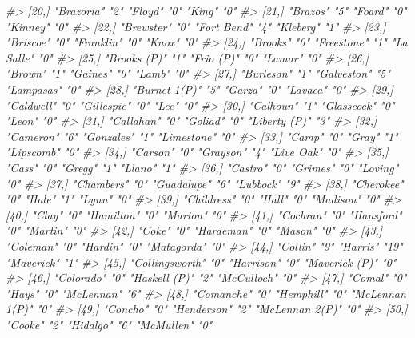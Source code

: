 \documentclass[
  12pt,
]{book}
\newenvironment{Shaded}{\begin{snugshade}}{\end{snugshade}}
\newcommand{\CommentTok}[1]{\textcolor[rgb]{0.56,0.35,0.01}{\textit{#1}}}
\begin{document}
\begin{Shaded}
\begin{Highlighting}[]
\CommentTok{\#> [20,] "Brazoria"      "2"  "Floyd"       "0"  "King"          "0" }
\CommentTok{\#> [21,] "Brazos"        "5"  "Foard"       "0"  "Kinney"        "0" }
\CommentTok{\#> [22,] "Brewster"      "0"  "Fort Bend"   "4"  "Kleberg"       "1" }
\CommentTok{\#> [23,] "Briscoe"       "0"  "Franklin"    "0"  "Knox"          "0" }
\CommentTok{\#> [24,] "Brooks"        "0"  "Freestone"   "1"  "La Salle"      "0" }
\CommentTok{\#> [25,] "Brooks (P)"    "1"  "Frio (P)"    "0"  "Lamar"         "0" }
\CommentTok{\#> [26,] "Brown"         "1"  "Gaines"      "0"  "Lamb"          "0" }
\CommentTok{\#> [27,] "Burleson"      "1"  "Galveston"   "5"  "Lampasas"      "0" }
\CommentTok{\#> [28,] "Burnet 1(P)"   "5"  "Garza"       "0"  "Lavaca"        "0" }
\CommentTok{\#> [29,] "Caldwell"      "0"  "Gillespie"   "0"  "Lee"           "0" }
\CommentTok{\#> [30,] "Calhoun"       "1"  "Glasscock"   "0"  "Leon"          "0" }
\CommentTok{\#> [31,] "Callahan"      "0"  "Goliad"      "0"  "Liberty (P)"   "3" }
\CommentTok{\#> [32,] "Cameron"       "6"  "Gonzales"    "1"  "Limestone"     "0" }
\CommentTok{\#> [33,] "Camp"          "0"  "Gray"        "1"  "Lipscomb"      "0" }
\CommentTok{\#> [34,] "Carson"        "0"  "Grayson"     "4"  "Live Oak"      "0" }
\CommentTok{\#> [35,] "Cass"          "0"  "Gregg"       "1"  "Llano"         "1" }
\CommentTok{\#> [36,] "Castro"        "0"  "Grimes"      "0"  "Loving"        "0" }
\CommentTok{\#> [37,] "Chambers"      "0"  "Guadalupe"   "6"  "Lubbock"       "9" }
\CommentTok{\#> [38,] "Cherokee"      "0"  "Hale"        "1"  "Lynn"          "0" }
\CommentTok{\#> [39,] "Childress"     "0"  "Hall"        "0"  "Madison"       "0" }
\CommentTok{\#> [40,] "Clay"          "0"  "Hamilton"    "0"  "Marion"        "0" }
\CommentTok{\#> [41,] "Cochran"       "0"  "Hansford"    "0"  "Martin"        "0" }
\CommentTok{\#> [42,] "Coke"          "0"  "Hardeman"    "0"  "Mason"         "0" }
\CommentTok{\#> [43,] "Coleman"       "0"  "Hardin"      "0"  "Matagorda"     "0" }
\CommentTok{\#> [44,] "Collin"        "9"  "Harris"      "19" "Maverick"      "1" }
\CommentTok{\#> [45,] "Collingsworth" "0"  "Harrison"    "0"  "Maverick (P)"  "0" }
\CommentTok{\#> [46,] "Colorado"      "0"  "Haskell (P)" "2"  "McCulloch"     "0" }
\CommentTok{\#> [47,] "Comal"         "0"  "Hays"        "0"  "McLennan"      "6" }
\CommentTok{\#> [48,] "Comanche"      "0"  "Hemphill"    "0"  "McLennan 1(P)" "0" }
\CommentTok{\#> [49,] "Concho"        "0"  "Henderson"   "2"  "McLennan 2(P)" "0" }
\CommentTok{\#> [50,] "Cooke"         "2"  "Hidalgo"     "6"  "McMullen"      "0" }

\end{Highlighting}
\end{Shaded}
\end{document}
